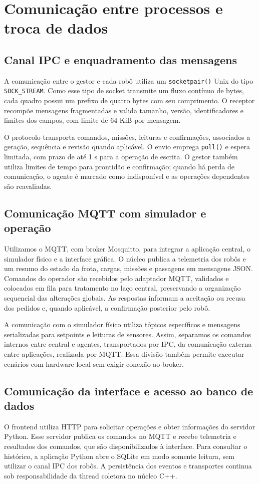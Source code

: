 \documentclass[12pt,a4paper]{article}
\newcommand{\code}[1]{\mbox{\texttt{#1}}}
\begin{document}
\section{Comunicação entre processos e troca de dados}
\subsection{Canal IPC e enquadramento das mensagens}
A comunicação entre o gestor e cada robô utiliza um \code{socketpair()} Unix do
tipo \code{SOCK\_STREAM}. Como esse tipo de socket transmite um fluxo contínuo
de bytes, cada quadro possui um prefixo de quatro bytes com seu comprimento. O
receptor recompõe mensagens fragmentadas e valida tamanho, versão,
identificadores e limites dos campos, com limite de 64 KiB por mensagem.

O protocolo transporta comandos, missões, leituras e confirmações, associados a
geração, sequência e revisão quando aplicável. O envio emprega \code{poll()} e
espera limitada, com prazo de até 1 s para a operação de escrita. O gestor
também utiliza limites de tempo para prontidão e confirmação; quando há perda
de comunicação, o agente é marcado como indisponível e as operações dependentes
são reavaliadas.

\subsection{Comunicação MQTT com simulador e operação}
Utilizamos o MQTT, com broker Mosquitto, para integrar a aplicação central, o
simulador físico e a interface gráfica. O núcleo publica a telemetria dos robôs
e um resumo do estado da frota, cargas, missões e passagens em mensagens JSON.
Comandos do operador são recebidos pelo adaptador MQTT, validados e colocados
em fila para tratamento no laço central, preservando a organização sequencial
das alterações globais. As respostas informam a aceitação ou recusa dos pedidos
e, quando aplicável, a confirmação posterior pelo robô.

A comunicação com o simulador físico utiliza tópicos específicos e mensagens
serializadas para setpoints e leituras de sensores. Assim, separamos os
comandos internos entre central e agentes, transportados por IPC, da
comunicação externa entre aplicações, realizada por MQTT. Essa divisão também
permite executar cenários com hardware local sem exigir conexão ao broker.

\subsection{Comunicação da interface e acesso ao banco de dados}
O frontend utiliza HTTP para solicitar operações e obter informações do
servidor Python. Esse servidor publica os comandos no MQTT e recebe telemetria
e resultados dos comandos, que são disponibilizados à interface. Para consultar
o histórico, a aplicação Python abre o SQLite em modo somente leitura, sem
utilizar o canal IPC dos robôs. A persistência dos eventos e transportes
continua sob responsabilidade da thread coletora no núcleo C++.
\end{document}
